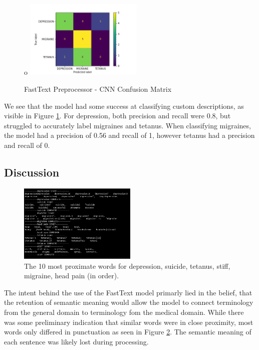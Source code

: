 \documentclass[12pt]{report}
\begin{document}
\begin{figure}[H]o
	\centering
	\includegraphics[width=0.5\textwidth]{confusion_matrix_ft.png}
	\caption{FastText Preprocessor - CNN Confusion Matrix}
	\label{fig:ft-con}
\end{figure}

We see that the model had some success at classifying custom descriptions, as visible in 
Figure \ref{fig:ft-con}.
For depression, both precision and recall were 0.8, but struggled to accurately
label migraines and tetanus. When classifying migraines, the model had a
precision of 0.56 and recall of 1, however tetanus had a precision and recall of
0.

\subsection{Discussion}

\begin{figure}[H]
	\centering
	\includegraphics[width=0.5\textwidth]{proximate-words.png}
	\caption{The 10 most proximate words for depression, suicide, tetanus, stiff, migraine, head pain (in order).}
	\label{fig:prox-words}
\end{figure}

The intent behind the use of the FastText model primarly lied in
the belief, that the retention of semantic meaning would allow the
model to connect terminology from the general domain to
terminology fom the medical domain. While there was some preliminary
indication that similar words were in close proximity, most words
only differed in punctuation as seen in Figure \ref{fig:prox-words}.
The semantic meaning of each sentence was likely lost during processing.
\end{document}
